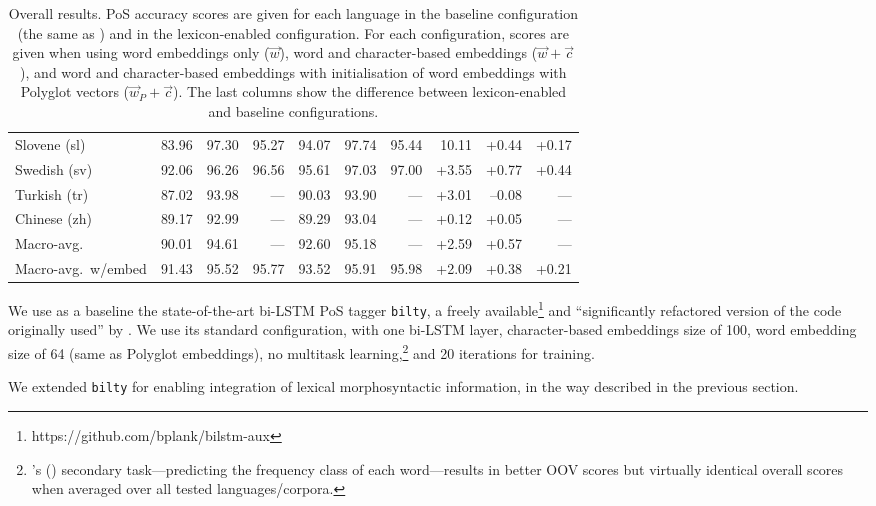 \documentclass[11pt,a4paper]{article}
\begin{document}
\begin{table}[t]
\begin{tabular}{l|rrr|rrr|rrr}
Slovene (sl) & 83.96 & 97.30 & 95.27 & 94.07 & 97.74 & 95.44 & 10.11 & +0.44 & +0.17\\
Swedish (sv) & 92.06 & 96.26 & 96.56 & 95.61 & 97.03 & 97.00 & +3.55 & +0.77 & +0.44\\
Turkish (tr) & 87.02 & 93.98 & --- & 90.03 & 93.90 & --- & +3.01 & --0.08 & ---\\
Chinese (zh) & 89.17 & 92.99 & --- & 89.29 & 93.04 & --- & +0.12 & +0.05 & ---\\
\midrule
Macro-avg. & 90.01 & 94.61 & --- & 92.60 & 95.18 & --- & +2.59 & +0.57 & ---\\
Macro-avg.~w/embed & 91.43 & 95.52 & 95.77 & 93.52 & 95.91 & 95.98 & +2.09 & +0.38 & +0.21\\
\end{tabular}
\caption{Overall results. PoS accuracy scores are given for each language in the baseline
  configuration (the same as \citealp{plank16}) and in the lexicon-enabled configuration. For each configuration, scores
are given when using word embeddings only ($\vec{w}$), word and character-based embeddings ($\vec{w}+\vec{c}$), and word
and character-based embeddings with initialisation of word embeddings with Polyglot vectors ($\vec{w}_P+\vec{c}$). The
 last columns show the difference between lexicon-enabled and baseline configurations.{}}\label{tbl:results}
\end{table}

We use as a baseline the state-of-the-art bi-LSTM PoS tagger \texttt{bilty}, a freely
available\footnote{https://github.com/bplank/bilstm-aux} and ``significantly refactored version of the code originally
used'' by \citet{plank16}. We use its standard configuration, with one bi-LSTM layer, character-based embeddings size of
100, word embedding size of 64 (same as Polyglot embeddings), no multitask learning,\footnote{\citeauthor{plank16}'s
  (\citeyear{plank16}) secondary task---predicting the frequency class of each word---results in better OOV scores but
  virtually identical overall scores when averaged over all tested languages/corpora.} and 20 iterations for training.

We extended \texttt{bilty} for enabling integration of lexical morphosyntactic information, in the way described in the
previous section.%
\end{document}

